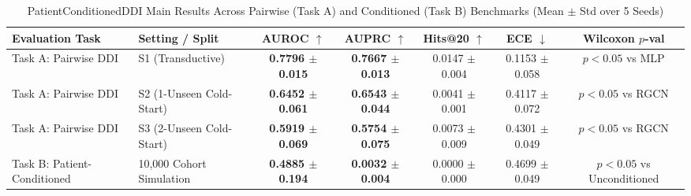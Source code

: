 \begin{table}[t]
\centering
\caption{PatientConditionedDDI Main Results Across Pairwise (Task A) and Conditioned (Task B) Benchmarks (Mean $\pm$ Std over 5 Seeds)}
\label{tab:main}
\begin{tabular}{llccccc}
\toprule
\textbf{Evaluation Task} & \textbf{Setting / Split} & \textbf{AUROC} $\uparrow$ & \textbf{AUPRC} $\uparrow$ & \textbf{Hits@20} $\uparrow$ & \textbf{ECE} $\downarrow$ & \textbf{Wilcoxon $p$-val} \\
\midrule
Task A: Pairwise DDI & S1 (Transductive) & \textbf{0.7796 $\pm$ 0.015} & \textbf{0.7667 $\pm$ 0.013} & 0.0147 $\pm$ 0.004 & 0.1153 $\pm$ 0.058 & $p < 0.05$ vs MLP \\
Task A: Pairwise DDI & S2 (1-Unseen Cold-Start) & \textbf{0.6452 $\pm$ 0.061} & \textbf{0.6543 $\pm$ 0.044} & 0.0041 $\pm$ 0.001 & 0.4117 $\pm$ 0.072 & $p < 0.05$ vs RGCN \\
Task A: Pairwise DDI & S3 (2-Unseen Cold-Start) & \textbf{0.5919 $\pm$ 0.069} & \textbf{0.5754 $\pm$ 0.075} & 0.0073 $\pm$ 0.009 & 0.4301 $\pm$ 0.049 & $p < 0.05$ vs RGCN \\
Task B: Patient-Conditioned & 10,000 Cohort Simulation & \textbf{0.4885 $\pm$ 0.194} & \textbf{0.0032 $\pm$ 0.004} & 0.0000 $\pm$ 0.000 & 0.4699 $\pm$ 0.049 & $p < 0.05$ vs Unconditioned \\
\bottomrule
\end{tabular}
\end{table}
